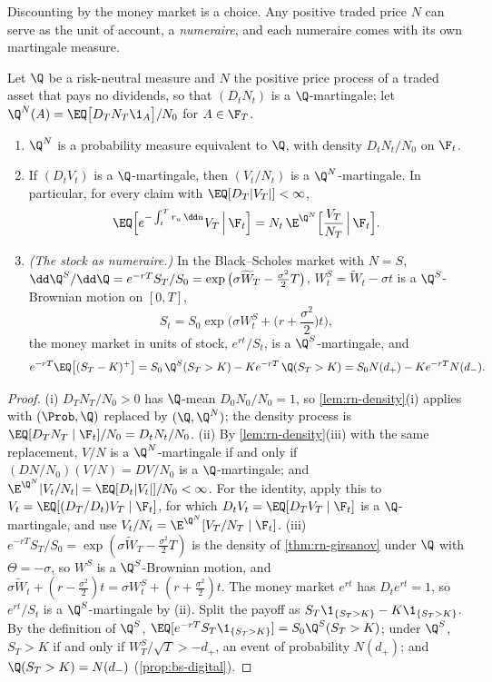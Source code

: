 Discounting by the money market is a choice. Any positive traded price $N$ can serve as the
unit of account, a \emph{numeraire}, and each numeraire comes with its own martingale
measure.

\begin{proposition}\label{prop:rn-numeraire}
Let $\Q$ be a risk-neutral measure and $N$ the positive price process of a traded asset that
pays no dividends, so that $(D_tN_t)$ is a $\Q$-martingale; let $\Q^N(A)=\EQ\big[D_TN_T\1_A\big]/N_0$
for $A\in\F_T$.
\begin{enumerate}[label=(\roman*)]
  \item $\Q^N$ is a probability measure equivalent to $\Q$, with density $D_tN_t/N_0$ on
    $\F_t$.
  \item If $(D_tV_t)$ is a $\Q$-martingale, then $(V_t/N_t)$ is a $\Q^N$-martingale. In
    particular, for every claim with $\EQ[D_T|V_T|]<\infty$,
    \[
      \EQ\Big[e^{-\int_t^Tr_u\,\dd u}V_T\,\Big|\,\F_t\Big]=N_t\,\E^{\Q^N}\Big[\frac{V_T}{N_T}\,\Big|\,\F_t\Big].
    \]
  \item \emph{(The stock as numeraire.)} In the Black--Scholes market with $N=S$,
    $\dd\Q^S/\dd\Q=e^{-rT}S_T/S_0=\exp\big(\sigma\widetilde W_T-\frac{\sigma^2}2T\big)$,
    $W^S_t=\widetilde W_t-\sigma t$ is a $\Q^S$-Brownian motion on $[0,T]$,
    \[
      S_t=S_0\exp\Big(\sigma W^S_t+\Big(r+\frac{\sigma^2}2\Big)t\Big),
    \]
    the money market in units of stock, $e^{rt}/S_t$, is a $\Q^S$-martingale, and
    \begin{equation}\label{eq:rn-call-numeraire}
      e^{-rT}\EQ\big[(S_T-K)^+\big]=S_0\,\Q^S(S_T>K)-Ke^{-rT}\,\Q(S_T>K)=S_0N(d_+)-Ke^{-rT}N(d_-).
    \end{equation}
\end{enumerate}
\end{proposition}

\begin{proof}
(i) $D_TN_T/N_0>0$ has $\Q$-mean $D_0N_0/N_0=1$, so \cref{lem:rn-density}(i) applies with
$(\Prob,\Q)$ replaced by $(\Q,\Q^N)$; the density process is $\EQ[D_TN_T\mid\F_t]/N_0=D_tN_t/N_0$.
(ii) By \cref{lem:rn-density}(iii) with the same replacement, $V/N$ is a $\Q^N$-martingale if
and only if $(D N/N_0)(V/N)=DV/N_0$ is a $\Q$-martingale; and
$\E^{\Q^N}|V_t/N_t|=\EQ[D_t|V_t|]/N_0<\infty$. For the identity, apply this to
$V_t=\EQ[(D_T/D_t)V_T\mid\F_t]$, for which $D_tV_t=\EQ[D_TV_T\mid\F_t]$ is a
$\Q$-martingale, and use $V_t/N_t=\E^{\Q^N}[V_T/N_T\mid\F_t]$.
(iii) $e^{-rT}S_T/S_0=\exp(\sigma\widetilde W_T-\frac{\sigma^2}2T)$ is the density of
\cref{thm:rn-girsanov} under $\Q$ with $\Theta=-\sigma$, so $W^S$ is a $\Q^S$-Brownian
motion, and $\sigma\widetilde W_t+(r-\frac{\sigma^2}2)t=\sigma W^S_t+(r+\frac{\sigma^2}2)t$.
The money market $e^{rt}$ has $D_te^{rt}=1$, so $e^{rt}/S_t$ is a $\Q^S$-martingale by (ii).
Split the payoff as $S_T\1_{\{S_T>K\}}-K\1_{\{S_T>K\}}$. By the definition of $\Q^S$,
$\EQ[e^{-rT}S_T\1_{\{S_T>K\}}]=S_0\Q^S(S_T>K)$; under $\Q^S$, $S_T>K$ if and only if
$W^S_T/\sqrt T>-d_+$, an event of probability $N(d_+)$; and $\Q(S_T>K)=N(d_-)$
(\cref{prop:bs-digital}).
\end{proof}

